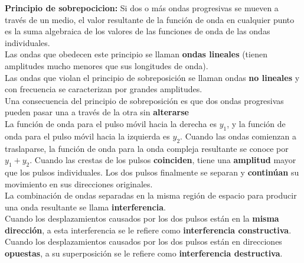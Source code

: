 \documentclass[10pt]{article}
\begin{document}
\textbf{Principio de sobrepocicion: } Si dos o más ondas progresivas se mueven a través de un medio, el valor resultante
de la función de onda en cualquier punto es la suma algebraica de los valores de las
funciones de onda de las ondas individuales.\\
\linebreak
Las ondas que obedecen este principio se llaman \textbf{ondas lineales} (tienen amplitudes mucho menores
que sus longitudes de onda).\\
\linebreak
Las ondas que violan el principio de sobreposición se llaman
ondas \textbf{no lineales} y con frecuencia se caracterizan por grandes amplitudes.\\
\linebreak
Una consecuencia del principio de sobreposición es que dos ondas progresivas pueden
pasar una a través de la otra sin \textbf{alterarse}\\
\linebreak
La función de onda para el pulso móvil hacia la derecha es $y_1$, y la función de onda para el
pulso móvil hacia la izquierda es $y_2$. Cuando las ondas comienzan a traslaparse, la función de
onda para la onda compleja resultante se conoce por $y_1+y_2$. Cuando las crestas de los
pulsos \textbf{coinciden}, tiene una \textbf{amplitud} 
mayor que los pulsos individuales. Los dos pulsos finalmente se separan y \textbf{continúan}
su movimiento en sus direcciones originales.\\
\linebreak
La combinación de ondas separadas en la misma región de espacio para producir una
onda resultante se llama \textbf{interferencia}.\\
\linebreak
Cuando los desplazamientos causados por los dos pulsos están en la \textbf{misma dirección}, a esta interferencia se le
refiere como \textbf{interferencia constructiva}.\\
\linebreak
Cuando los desplazamientos causados por los dos pulsos están en direcciones
\textbf{opuestas}, a su superposición se le refiere como \textbf{interferencia destructiva}.\\
\linebreak
\end{document}
